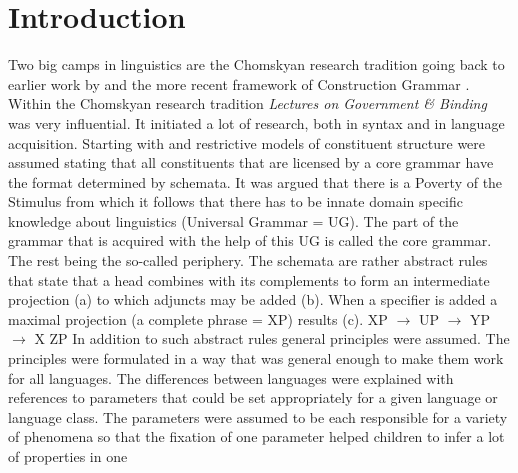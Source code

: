 

\chapter{Introduction}


Two big camps in linguistics are the Chomskyan research tradition
\citep{Chomsky81a,Chomsky95a-u} going back to earlier work by \citet{Chomsky57a} and the
more recent framework of Construction Grammar
\citep*{FKoC88a,Goldberg95a,Goldberg2006a,Tomasello2003a}. Within the Chomskyan research tradition
\emph{Lectures on Government \& Binding} was very influential. It initiated a lot of research, both
in syntax and in language acquisition. Starting with \citet{Chomsky73a} and \citet{Jackendoff77a}
restrictive models of constituent structure were assumed stating that all constituents that are
licensed by a core grammar have the format determined by \xbar schemata. It was argued that there is
a Poverty of the Stimulus from which it follows that there has to be innate domain specific
knowledge about linguistics (Universal Grammar = UG). The part of the grammar that is acquired with
the help of this UG is called the core grammar. The rest being the so-called periphery. The \xbar
schemata are rather abstract rules that state that a head combines with its complements to form an
intermediate projection (a) to which adjuncts may be added (b). When a specifier is added a maximal
projection (a complete phrase = XP) results (c).
\eal
\ex XP $\to$ UP \xbar
\ex \xbar $\to$ \xbar YP
\ex \xbar $\to$ X ZP
\zl
In addition to such abstract rules general principles were assumed. The principles were formulated
in a way that was general enough to make them work for all languages. The differences between
languages were explained with references to parameters that could be set appropriately for a given
language or language class. The parameters were assumed to be each responsible for a variety of
phenomena so that the fixation of one parameter helped children to infer a lot of properties in one
